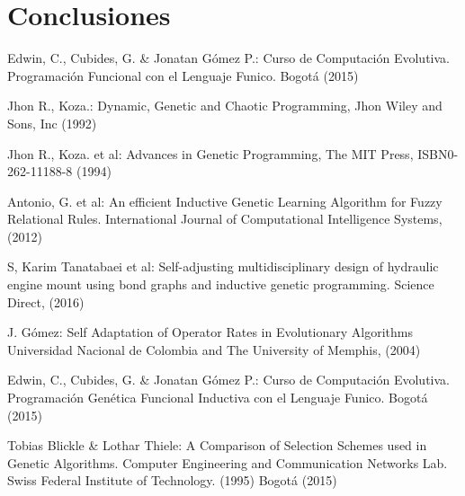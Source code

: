 \documentclass{llncs}
\begin{document}
\section{Conclusiones}

\begin{thebibliography}{8}
%
Edwin, C., Cubides, G. \& Jonatan Gómez P.:
Curso de Computación Evolutiva. Programación Funcional con el Lenguaje Funico.
Bogotá (2015)

Jhon R., Koza.:
Dynamic, Genetic and Chaotic Programming,
Jhon Wiley and Sons, Inc (1992)

Jhon R., Koza. et al:
Advances in Genetic Programming, 
The MIT Press, ISBN0-262-11188-8 (1994)

Antonio, G. et al:
An efficient Inductive Genetic Learning Algorithm for Fuzzy Relational Rules.
International Journal of Computational Intelligence Systems, (2012)

S, Karim Tanatabaei et al:
Self-adjusting multidisciplinary design of hydraulic engine mount using bond graphs and inductive genetic programming.
Science Direct, (2016)

J. Gómez:
Self Adaptation of Operator Rates in Evolutionary Algorithms
Universidad Nacional de Colombia and The University of Memphis, (2004)

Edwin, C., Cubides, G. \& Jonatan Gómez P.:
Curso de Computación Evolutiva. Programación Genética Funcional Inductiva con el Lenguaje Funico.
Bogotá (2015)

Tobias Blickle \& Lothar Thiele:
A Comparison of Selection Schemes used in Genetic Algorithms.
Computer Engineering and Communication Networks Lab.
Swiss Federal Institute of Technology. (1995)
Bogotá (2015)

\end{thebibliography}
\end{document}
